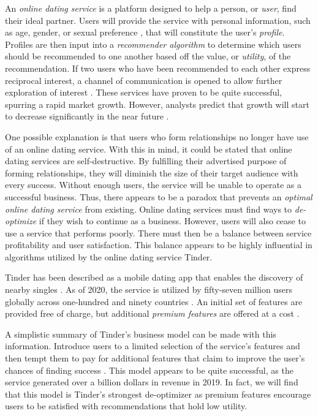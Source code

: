 An \textit{online dating service} is a platform designed to help a person, or \textit{user}, find their ideal partner. Users will provide the service with personal information, such as age, gender, or sexual preference \citep{Courtois2018}, that will constitute the user's \textit{profile}. Profiles are then input into a \textit{recommender algorithm} \citep{Andrews2015} to determine which users should be recommended to one another based off the value, or \textit{utility}, of the recommendation. If two users who have been recommended to each other express reciprocal interest, a channel of communication is opened to allow further exploration of interest \citep{Courtois2018}. These services have proven to be quite successful, spurring a rapid market growth. However, analysts predict that growth will start to decrease significantly in the near future \citep{Leskin2019}. 

One possible explanation is that users who form relationships no longer have use of an online dating service. With this in mind, it could be stated that online dating services are self-destructive. By fulfilling their advertised purpose of forming relationships, they will diminish the size of their target audience with every success. Without enough users, the service will be unable to operate as a successful business. Thus, there appears to be a paradox that prevents an \textit{optimal online dating service} from existing. Online dating services must find ways to \textit{de-optimize} if they wish to continue as a business. However, users will also cease to use a service that performs poorly. There must then be a balance between service profitability and user satisfaction. This balance appears to be highly influential in algorithms utilized by the online dating service Tinder.

Tinder has been described as a mobile dating app that enables the discovery of nearby singles \citep{Seidman2017}. As of 2020, the service is utilized by fifty-seven million users globally across one-hundred and ninety countries \citep{Iqbal2020}. An initial set of features are provided free of charge, but additional \textit{premium features} are offered at a cost \citep{Tinder2020}. 

A simplistic summary of Tinder's business model can be made with this information. Introduce users to a limited selection of the service's features and then tempt them to pay for additional features that claim to improve the user's chances of finding success \citep{Courtois2018}. This model appears to be quite successful, as the service generated over a billion dollars in revenue in 2019. In fact, we will find that this model is Tinder's strongest de-optimizer as premium features encourage users to be satisfied with recommendations that hold low utility. %

